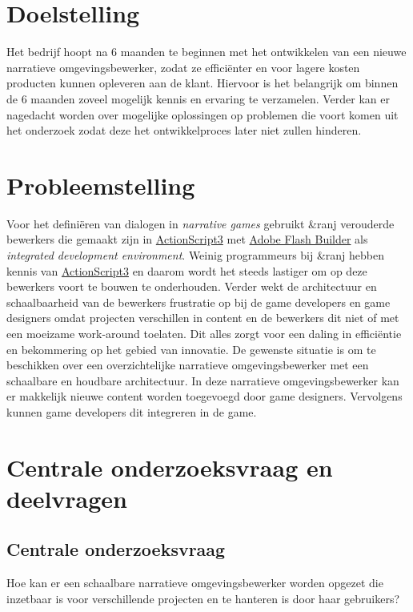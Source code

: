 \documentclass{report}
\newcommand{\organisation}{\&ranj }
\begin{document}
\section{Doelstelling}
Het bedrijf hoopt na 6 maanden te beginnen met het ontwikkelen van een nieuwe narratieve omgevingsbewerker, zodat ze effici{\"e}nter en voor lagere kosten producten kunnen opleveren aan de klant. Hiervoor is het belangrijk om binnen de 6 maanden zoveel mogelijk kennis en ervaring te verzamelen. Verder kan er nagedacht worden over mogelijke oplossingen op problemen die voort komen uit het onderzoek zodat deze het ontwikkelproces later niet zullen hinderen.

\section{Probleemstelling}
Voor het defini{\"e}ren van dialogen in \emph{narrative games} gebruikt \organisation verouderde bewerkers die gemaakt zijn in \href{http://www.adobe.com/devnet/actionscript/articles/actionscript3_overview.html}{ActionScript3} met \href{https://en.wikipedia.org/wiki/Adobe_Flash_Builder}{Adobe Flash Builder} als \emph{integrated development environment}. Weinig programmeurs bij \organisation hebben kennis van \href{http://www.adobe.com/devnet/actionscript/articles/actionscript3_overview.html}{ActionScript3} en daarom wordt het steeds lastiger om op deze bewerkers voort te bouwen te onderhouden. Verder wekt de architectuur en schaalbaarheid van de bewerkers frustratie op bij de game developers en game designers omdat projecten verschillen in content en de bewerkers dit niet of met een moeizame work-around toelaten. Dit alles zorgt voor een daling in effici{\"e}ntie en bekommering op het gebied van innovatie.
De gewenste situatie is om te beschikken over een overzichtelijke narratieve omgevingsbewerker met een schaalbare en houdbare architectuur. In deze narratieve omgevingsbewerker kan er makkelijk nieuwe content worden toegevoegd door game designers. Vervolgens kunnen game developers dit integreren in de game.

\section{Centrale onderzoeksvraag en deelvragen}
\subsection{Centrale onderzoeksvraag}
Hoe kan er een schaalbare narratieve omgevingsbewerker worden opgezet die inzetbaar is voor verschillende projecten en te hanteren is door haar gebruikers?
\end{document}
